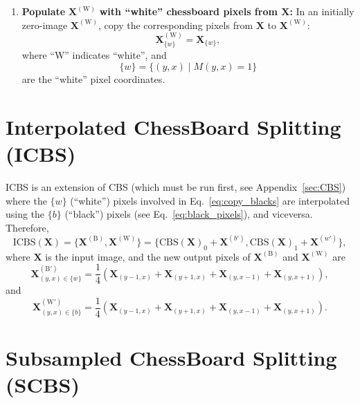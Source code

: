 \begin{subappendices}
\begin{enumerate}
\item \textbf{Populate} $\mathbf{X}^{(\text{W})}$ \textbf{with
    ``white'' chessboard pixels from $\mathbf{X}$:} In an initially
  zero-image $\mathbf{X}^{(\text{W})}$, copy the corresponding pixels
  from $\mathbf{X}$ to $\mathbf{X}^{(\text{W})}$:
  \begin{equation}
    \mathbf{X}^{(\text{W})}_{\{w\}} = \mathbf{X}_{\{w\}},
    \label{eq:copy_whites}
  \end{equation}
  where ``W'' indicates ``white'', and
  \begin{equation}
    \{w\} = \{(y, x) \mid M(y, x)=1\}
    \label{eq:white_pixels}
  \end{equation}
  are the ``white'' pixel coordinates.
  
\end{enumerate}


\section{Interpolated ChessBoard Splitting (ICBS)}
\label{sec:ICBS}

\gls{ICBS} is an extension of \gls{CBS} (which must be run first, see
Appendix~\ref{sec:CBS}) where the $\{w\}$ (``white'') pixels involved
in Eq.~\ref{eq:copy_blacks} are interpolated using the $\{b\}$
(``black'') pixels (see Eq.~\ref{eq:black_pixels}), and
viceversa. Therefore,
\begin{equation}
  \mathrm{ICBS}(\mathbf{X})=\{\mathbf{X}^{(\text{B})},\mathbf{X}^{(\text{W})}\}=\{\text{CBS}(\mathbf{X})_0 + \mathbf{X}^{(b')},\text{CBS}(\mathbf{X})_1 + \mathbf{X}^{(w')}\},
\end{equation}
where $\mathbf{X}$ is the input image, and the new output pixels of
$\mathbf{X}^{(\text{B})}$ and $\mathbf{X}^{(\text{W})}$ are
\begin{equation}
  \mathbf{X}^{(\text{B}')}_{(y,x)\in\{w\}} = \frac{1}{4}(\mathbf{X}_{(y-1,x)}+\mathbf{X}_{(y+1,x)}+\mathbf{X}_{(y,x-1)}+\mathbf{X}_{(y,x+1)}),
\end{equation}
and
\begin{equation}
  \mathbf{X}^{(\text{W}')}_{(y,x)\in\{b\}} = \frac{1}{4}(\mathbf{X}_{(y-1,x)}+\mathbf{X}_{(y+1,x)}+\mathbf{X}_{(y,x-1)}+\mathbf{X}_{(y,x+1)}).
\end{equation}


\section{Subsampled ChessBoard Splitting (SCBS)}
\label{sec:SCBS}


\end{subappendices}
